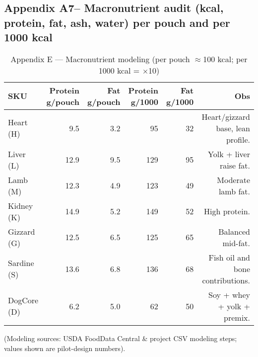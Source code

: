 \subsection*{Appendix A7-- Macronutrient audit (kcal, protein, fat, ash, water) per pouch and per 1000 kcal}
\begin{table}[h]
\centering
\caption{Appendix E --- Macronutrient modeling (per pouch $\approx$100 kcal; per 1000 kcal = $\times$10)}
\begin{adjustbox}{max width=\textwidth}\begin{tabular}{l r r r r r}
\toprule
SKU & Protein g/pouch & Fat g/pouch & Protein g/1000 & Fat g/1000 & Obs \\
\midrule
Heart (H) & 9.5 & 3.2 & 95 & 32 & Heart/gizzard base, lean profile. \\
Liver (L) & 12.9 & 9.5 & 129 & 95 & Yolk + liver raise fat. \\
Lamb (M) & 12.3 & 4.9 & 123 & 49 & Moderate lamb fat. \\
Kidney (K) & 14.9 & 5.2 & 149 & 52 & High protein. \\
Gizzard (G) & 12.5 & 6.5 & 125 & 65 & Balanced mid-fat. \\
Sardine (S) & 13.6 & 6.8 & 136 & 68 & Fish oil and bone contributions. \\
DogCore (D) & 6.2 & 5.0 & 62 & 50 & Soy + whey + yolk + premix. \\
\bottomrule
\end{tabular}\end{adjustbox}
\end{table}
\noindent (Modeling sources: USDA FoodData Central \& project CSV modeling steps; values shown are pilot-design numbers).
